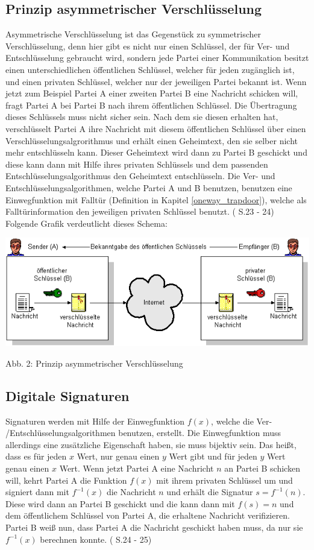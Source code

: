 \documentclass[a4paper,12pt,titlepage]{article}
\begin{document}
\subsection{Prinzip asymmetrischer Verschlüsselung}\label{asymm:prinzip}
Asymmetrische Verschlüsselung ist das Gegenstück zu symmetrischer Verschlüsselung, denn hier gibt es nicht nur einen Schlüssel, der für Ver- und Entschlüsselung gebraucht wird, sondern jede Partei einer Kommunikation besitzt einen unterschiedlichen öffentlichen Schlüssel, welcher für jeden zugänglich ist, und einen privaten Schlüssel, welcher nur der jeweiligen Partei bekannt ist. Wenn jetzt zum Beispiel Partei A einer zweiten Partei B eine Nachricht schicken will, fragt Partei A bei Partei B nach ihrem öffentlichen Schlüssel. Die Übertragung dieses Schlüssels muss nicht sicher sein. Nach dem sie diesen erhalten hat, verschlüsselt Partei A ihre Nachricht mit diesem öffentlichen Schlüssel über einen Verschlüsselungsalgrorithmus und erhält einen Geheimtext, den sie selber nicht mehr entschlüsseln kann. Dieser Geheimtext wird dann zu Partei B geschickt und diese kann dann mit Hilfe ihres privaten Schlüssels und dem passenden Entschlüsselungsalgorithmus den Geheimtext entschlüsseln. Die Ver- und Entschlüsselungsalgorithmen, welche Partei A und B benutzen, benutzen eine Einwegfunktion mit Falltür (Definition in Kapitel \ref{oneway_trapdoor}), welche als Falltürinformation den jeweiligen privaten Schlüssel benutzt. (\cite{delfs_knebl} S.23 - 24) \newline Folgende Grafik verdeutlicht dieses Schema:
\begin{center}
\includegraphics[scale=0.7]{asymm_shema.png} %
\end{center}
Abb. 2: Prinzip asymmetrischer Verschlüsselung
\subsection{Digitale Signaturen}\label{asymm:sign}
Signaturen werden mit Hilfe der Einwegfunktion $f(x)$, welche die Ver- /Entschlüsselungsalgorithmen benutzen, erstellt. Die Einwegfunktion muss allerdings eine zusätzliche Eigenschaft haben, sie muss bijektiv sein. Das heißt, dass es für jeden $x$ Wert, nur genau einen $y$ Wert gibt und für jeden $y$ Wert genau einen $x$ Wert.
Wenn jetzt Partei A eine Nachricht $n$ an Partei B schicken will, kehrt Partei A die Funktion $f(x)$ mit ihrem privaten Schlüssel um und signiert dann mit $f^{-1}(x)$ die Nachricht $n$ und erhält die Signatur $s = f^{-1}(n)$. Diese wird dann an Partei B geschickt und die kann dann mit $f(s) = n$ und dem öffentlichem Schlüssel von Partei A, die erhaltene Nachricht verifizieren. Partei B weiß nun, dass Partei A die Nachricht geschickt haben muss, da nur sie $f^{-1}(x)$ berechnen konnte. (\cite{delfs_knebl} S.24 - 25)
\end{document}
